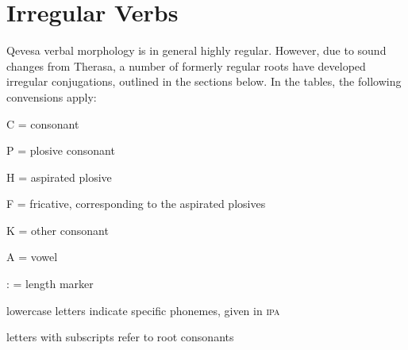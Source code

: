 \documentclass[grammar]{subfiles}
\begin{document}




  \newpage
  \section{Irregular Verbs}
  \label{sec:vm_irregular}

  Qevesa verbal morphology is in general highly regular.  However, due to sound
  changes from Therasa, a number of formerly regular roots have developed
  irregular conjugations, outlined in the sections below.  In the tables, the
  following convensions apply: 

  \begin{itemize*}
    \item C = consonant
    \item P = plosive consonant
    \item H = aspirated plosive
    \item F = fricative, corresponding to the aspirated plosives
    \item K = other consonant
    \item A = vowel
    \item : = length marker
    \item lowercase letters indicate specific phonemes, given in \textsc{ipa}
    \item letters with subscripts refer to root consonants
  \end{itemize*}
  
\end{document}

